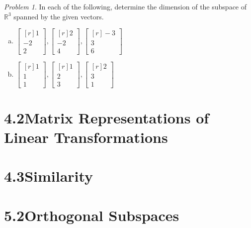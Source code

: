 \documentclass[12pt, letterpaper]{article}
\theoremstyle{remark}
\newtheorem{problem}{Problem}
\theoremstyle{remark}
\begin{document}
\begin{problem}

In each of the following, determine the dimension
of the subspace of \(\mathbb{R}^3\) spanned by the given vectors.

\begin{enumerate}[(a)]
	\item \(
	      \begin{bmatrix*}[r]
		      1 \\
		      -2 \\
		      2
	      \end{bmatrix*},
	      \begin{bmatrix*}[r]
		      2 \\
		      -2 \\
		      4
	      \end{bmatrix*},
	      \begin{bmatrix*}[r]
		      -3 \\
		      3 \\
		      6
	      \end{bmatrix*}
	      \)
	\item \(
	      \begin{bmatrix*}[r]
		      1 \\
		      1 \\
		      1
	      \end{bmatrix*},
	      \begin{bmatrix*}[r]
		      1 \\
		      2 \\
		      3
	      \end{bmatrix*},
	      \begin{bmatrix*}[r]
		      2 \\
		      3 \\
		      1
	      \end{bmatrix*}
	      \)

\end{enumerate}

\end{problem}

\section*{4.2\quad{}Matrix Representations of Linear Transformations}

\section*{4.3\quad{}Similarity}

\section*{5.2\quad{}Orthogonal Subspaces}
\end{document}
